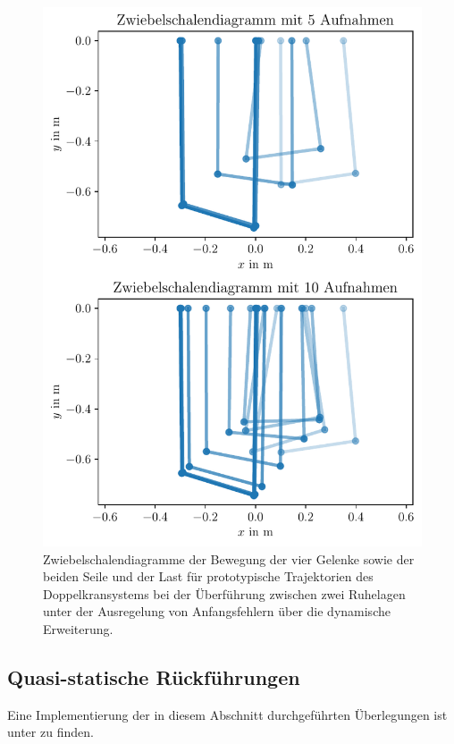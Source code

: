 \begin{figure}[H]
	\begin{center}
		\includegraphics[scale=1]{Pictures/onion_skinned_dynamic}
	\end{center}
	\caption[Zwiebelschalendiagramm Ruhelagenüberführung mit Regelung über dynamische Erweiterung]
	{Zwiebelschalendiagramme der Bewegung der vier Gelenke sowie der beiden Seile und der Last für prototypische Trajektorien des Doppelkransystems bei der Überführung zwischen zwei Ruhelagen unter der Ausregelung von Anfangsfehlern über die dynamische Erweiterung.}
	\label{onion_skinned_dyn_controller_initial_error}
\end{figure}

\subsection{Quasi-statische Rückführungen}
\label{sec:quasi_static_control}
Eine Implementierung der in diesem Abschnitt durchgeführten Überlegungen ist unter \cite[flatness\_notebooks/ODE\_flatness\_trajectory\_control\_simulation\_qstat.ipynb]{SAGithub} zu finden.

